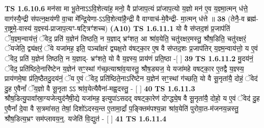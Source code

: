 \documentclass[17pt]{extarticle}
\begin{document}
                  \newline
                                \textbf{ TS 1.6.10.6} \newline
                  मन॑सा मा भू॒तेनाऽऽवि॒शेत्या॑ह॒ मनो॒ वै प्रा॑जाप॒त्यं प्रा॑जाप॒त्यो य॒ज्ञो मन॑ ए॒व य॒ज्ञ्मा॒त्मन् ध॑त्ते॒ वाग॑स्यै॒न्द्री स॑पत्न॒क्षय॑णी वा॒चा मे᳚न्द्रि॒येणा-ऽऽवि॒शेत्या॑है॒न्द्री वै वाग्वाच॑-मे॒वैन्द्री- मा॒त्मन् ध॑त्ते ॥ \textbf{  38} \newline
                  \newline
                      (तेनै॒-व ब्रह्म॑- रा॒ष्ट्रमे॒-वास्य॑ य॒ज्ञ्स्य॑-प्राजाप॒त्यꣳ-षट्त्रिꣳ॑शच्च)  \textbf{(A10)} \newline \newline
                                        \textbf{ TS 1.6.11.1} \newline
                  यो वै स॑प्तद॒शं प्र॒जाप॑तिं ॅय॒ज्ञ्म॒न्वाय॑त्तं॒ ॅवेद॒ प्रति॑ य॒ज्ञेन॑ तिष्ठति॒ न य॒ज्ञाद् भ्रꣳ॑शत॒ आ श्रा॑व॒येति॒ चतु॑रक्षर॒मस्तु॒ श्रौष॒डिति॒ चतु॑रक्षरं॒ ॅयजेति॒ द्व्य॑क्षरं॒ ॅये यजा॑मह॒ इति॒ पञ्चा᳚क्षरं द्व्यक्ष॒रो व॑षट्का॒र ए॒ष वै स॑प्तद॒शः प्र॒जाप॑तिर् य॒ज्ञ्म॒न्वाय॑त्तो॒ य ए॒वं ॅवेद॒ प्रति॑ य॒ज्ञेन॑ तिष्ठति॒ न य॒ज्ञाद्- भ्रꣳ॑शते॒ यो वै य॒ज्ञ्स्य॒ प्राय॑णं प्रति॒ष्ठा -[ ] \textbf{  39} \newline
                  \newline
                                \textbf{ TS 1.6.11.2} \newline
                  मु॒दय॑नं॒ ॅवेद॒ प्रति॑ष्ठिते॒नारि॑ष्टेन य॒ज्ञेन॑ सꣳ॒॒स्थां ग॑च्छ॒त्याश्रा॑व॒यास्तु॒ श्रौष॒ड्यज॒ ये यजा॑महे वषट्का॒र ए॒तद्वै य॒ज्ञ्स्य॒ प्राय॑णमे॒षा प्र॑ति॒ष्ठैतदु॒दय॑नं॒ ॅय ए॒वं ॅवेद॒ प्रति॑ष्ठिते॒नाऽरि॑ष्टेन य॒ज्ञेन॑ सꣳ॒॒स्थां ग॑च्छति॒ यो वै सू॒नृता॑यै॒ दोहं॒ ॅवेद॑ दु॒ह ए॒वैनां᳚ ॅय॒ज्ञो वै सू॒नृता ऽऽ श्रा॑व॒येत्यैवैना॑-मह्व॒दस्तु॒ - [ ] \textbf{  40} \newline
                  \newline
                                \textbf{ TS 1.6.11.3} \newline
                  श्रौष॒डित्यु॒पावा᳚स्रा॒ग्यजेत्युद॑नैषी॒द्ये यजा॑मह॒ इत्युपा॑ऽसदद् वषट्का॒रेण॑ दोग्द्ध्ये॒ष वै सू॒नृता॑यै॒ दोहो॒ य ए॒वं ॅवेद॑ दु॒ह ए॒वैनां᳚ दे॒वा वै स॒त्रमा॑सत॒ तेषां॒ दिशो॑ऽदस्य॒न्त ए॒तामा॒र्द्रां प॒ङ्क्तिम॑पश्य॒न्ना श्रा॑व॒येति॑ पुरोवा॒त-म॑जनय॒न्नस्तु॒ श्रौष॒डित्य॒भ्रꣳ सम॑प्लावय॒न्॒. यजेति॑ वि॒द्युत॑ - [ ] \textbf{  41} \newline
                  \newline
                                \textbf{ TS 1.6.11.4} \newline
\end{document}
